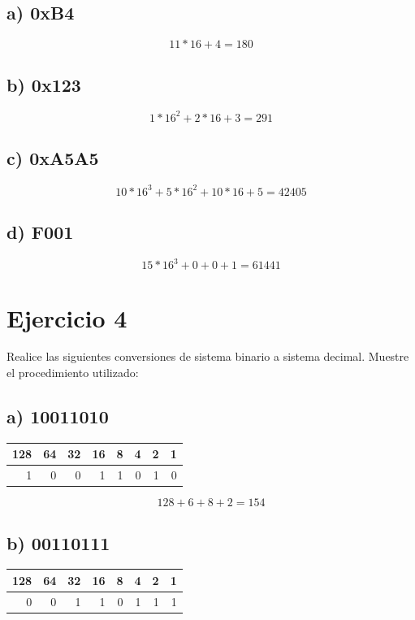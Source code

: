 \documentclass[12pt]{article}
\begin{document}
\subsection*{a) 0xB4}
\label{sec:org1970404}
\[
11 * 16 + 4 = 180
\]

\subsection*{b) 0x123}
\label{sec:org4da309f}
\[
1*16^2 + 2*16 + 3 = 291
\]

\subsection*{c) 0xA5A5}
\label{sec:org3b0bca2}
\[
10*16^3 + 5*16^2 + 10*16 + 5 = 42405
\]

\subsection*{d) F001}
\label{sec:orgc4591ab}
\[
15*16^3+0+0+1 = 61441
\]

\section*{Ejercicio 4}
\label{sec:org2725beb}
Realice las siguientes conversiones de sistema binario a sistema decimal. Muestre el procedimiento utilizado:

\subsection*{a) 10011010}
\label{sec:org92b53c6}
\begin{center}
\begin{tabular}{rrrrrrrr}
128 & 64 & 32 & 16 & 8 & 4 & 2 & 1\\
\hline
1 & 0 & 0 & 1 & 1 & 0 & 1 & 0\\
\end{tabular}
\end{center}

\[
128 + 6 + 8 + 2 = 154
\]

\subsection*{b) 00110111}
\label{sec:org9853cff}
\begin{center}
\begin{tabular}{rrrrrrrr}
128 & 64 & 32 & 16 & 8 & 4 & 2 & 1\\
\hline
0 & 0 & 1 & 1 & 0 & 1 & 1 & 1\\
\end{tabular}
\end{center}
\end{document}
